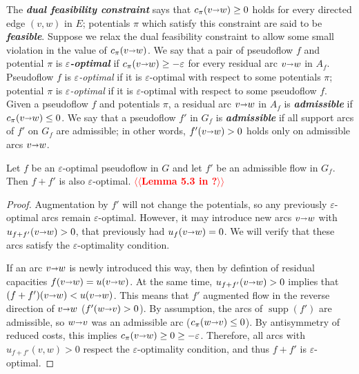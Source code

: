 \documentclass[a4paper,UKenglish]{socg-lipics-v2018}
\makeatletter
\def\note#1{\textcolor{red}{{#1}}}
\def\eps{\varepsilon}
\def\arcto{\mathord\shortrightarrow}
\def\arc#1#2{#1\arcto#2}
\def\supp{\operatorname{supp}}
\theoremstyle{plain}
\numberwithin{figure}{section}
\def\EMPH#1{\textbf{\emph{\boldmath #1}}}
\def\n@te#1{\textsf{\boldmath \textbf{$\langle\!\langle$#1$\rangle\!\rangle$}}\leavevmode}
\def\note#1{\textcolor{red}{\n@te{#1}}}
\makeatother
\begin{document}
The \EMPH{dual feasibility constraint} says that $c_\pi(\arc vw) \geq 0$ holds for every directed edge $(v,w)$ in $E$; potentials $\pi$ which satisfy this constraint are said to be \EMPH{feasible}.
%
%
Suppose we relax the dual feasibility constraint to allow some small violation in the value of $c_\pi(\arc vw)$.
We say that a pair of pseudoflow $f$ and potential $\pi$ is \EMPH{$\eps$-optimal} \cite{tar-spmcc-1985,be-darml-1987} if
$c_\pi(\arc vw) \geq -\eps$ for every residual arc $\arc vw$ in $A_f$.  Pseudoflow $f$ is \emph{$\eps$-optimal} if it is $\eps$-optimal with respect to some potentials $\pi$; potential $\pi$ is \emph{$\eps$-optimal} if it is $\eps$-optimal with respect to some pseudoflow $f$.
%
Given a pseudoflow $f$ and potentials $\pi$, a residual arc $\arc vw$ in $A_f$ is
\EMPH{admissible} if $c_\pi(\arc vw) \leq 0$.
We say that a pseudoflow $f'$ in $G_f$ is \EMPH{admissible} if all support arcs of $f'$ on $G_f$ are admissible; in other words, $f'(\arc vw) > 0$ holds
only on admissible arcs $\arc vw$.

\begin{lemmarep}
\label{lemma:eps_opt_preserve}
Let $f$ be an $\eps$-optimal pseudoflow in $G$ and let $f'$ be an
admissible flow in $G_f$.
Then $f + f'$ is also $\eps$-optimal.
\note{Lemma 5.3 in \cite{GT90}?}
\end{lemmarep}

\begin{proof}
Augmentation by $f'$ will not change the potentials, so any previously
$\eps$-optimal arcs remain $\eps$-optimal.
However, it may introduce new arcs $\arc vw$ with $u_{f+f'}(\arc vw) > 0$, that previously had
$u_f(\arc vw) = 0$.
We will verify that these arcs satisfy the $\eps$-optimality condition.

If an arc $\arc vw$ is newly introduced this way, then by defintion of residual
capacities $f(\arc vw) = u(\arc vw)$.
At the same time, $u_{f+f'}(\arc vw) > 0$ implies that $(f+f')(\arc vw) < u(\arc vw)$.
This means that $f'$ augmented flow in the reverse direction of $\arc vw$
($f'(\arc wv) > 0$).
By assumption, the arcs of $\supp(f')$ are admissible, so $\arc wv$ was an
admissible arc ($c_\pi(\arc wv) \leq 0$).
By antisymmetry of reduced costs, this implies $c_\pi(\arc vw) \geq 0 \geq -\eps$.
Therefore, all arcs with $u_{f+f'}(v, w) > 0$ respect the $\eps$-optimality condition,
and thus $f+f'$ is $\eps$-optimal.
\end{proof}
\end{document}
